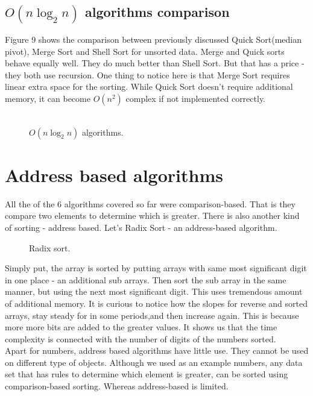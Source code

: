\documentclass{acm_proc_article-sp}
\begin{document}
\subsection{$O(n \log_2 n)$ algorithms comparison}
Figure 9 shows the comparison between previously discussed Quick Sort(median pivot), Merge Sort and Shell Sort for unsorted data. Merge and Quick sorts behave equally well. They do much better than Shell Sort. But that has a price - they both use recursion.  One thing to notice here is that Merge Sort requires linear extra space for the sorting. While Quick Sort doesn't require additional memory, it can become $O(n^2)$ complex if not implemented correctly.\\\\
\begin{figure}[!htb]
\caption{$O(n \log_2 n)$ algorithms.}
\end{figure}
 
\section{Address based algorithms}
All the of the 6 algorithms covered so far were comparison-based. That is they compare two elements to determine which is greater. There is also another kind of sorting - address based. Let's Radix Sort - an address-based algorithm. \\ 
\begin{figure}[!htb]
\caption{Radix sort.}
\end{figure}

Simply put, the array is sorted by putting arrays with same most significant digit in one place - an additional sub arrays. Then sort the sub array in the same manner, but using the next most significant digit. This uses tremendous amount of additional memory.  It is curious to notice how the slopes for reverse and sorted arrays, stay steady for in some periods,and then increase again. This is because more more bits are added to the greater values. It shows us that the time complexity is connected with the number of digits of the numbers sorted. \\

Apart for numbers, address based algorithms have little use. They cannot be used on different type of objects. Although we used as an example numbers, any data set that has rules to determine which element is greater, can be sorted using comparison-based sorting. Whereas address-based is limited.\\
\end{document}
